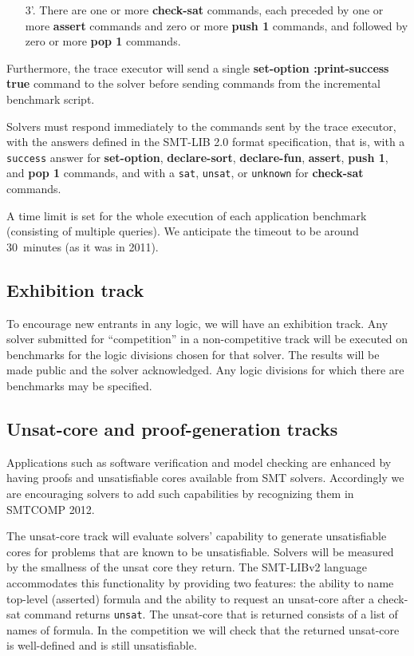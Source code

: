 \documentclass[12pt]{article}
\newcommand{\akey}[1]{\textbf{#1}}
\begin{document}
\begin{enumerate}
\item[3'.] There are one or more \akey{check-sat} commands, 
  each preceded by one or more \akey{assert} commands 
  and zero or more \akey{push 1} commands, 
  and followed by zero or more \akey{pop 1} commands.
\end{enumerate}

\noindent
Furthermore, the trace executor will send a single 
\akey{set-option :print-success true} command to the solver before 
sending commands from the incremental benchmark script.

\medskip
Solvers must respond immediately to the commands sent by the trace executor, 
with the answers defined in the SMT-LIB 2.0 format specification, that is,
with a \texttt{success} answer for 
\akey{set-option}, 
\akey{declare-sort}, 
\akey{declare-fun}, 
\akey{assert}, 
\akey{push 1}, 
and \akey{pop 1} 
commands,
and with a \texttt{sat}, \texttt{unsat}, or \texttt{unknown} 
for \akey{check-sat} commands.

A time limit is set for the whole execution of each application
benchmark (consisting of multiple queries).  We anticipate the
timeout to be around 30~minutes (as it was in 2011).

\subsection{Exhibition track}

To encourage new entrants in any logic, we will have an exhibition track.
Any solver submitted for ``competition'' in a non-competitive track will
be executed on benchmarks for the logic divisions chosen for that solver.
The results will be made public and the solver acknowledged. Any logic divisions
for which there are benchmarks may be specified.

\subsection{Unsat-core and proof-generation tracks}

Applications such as software verification and model checking are enhanced by having
proofs and unsatisfiable cores available from SMT solvers. Accordingly we are 
encouraging solvers to add such capabilities by recognizing them in SMTCOMP 2012.

The unsat-core track will evaluate solvers' capability to generate unsatisfiable cores for
problems that are known to be unsatisfiable. Solvers will be measured by the smallness of
the unsat core they return. The SMT-LIBv2 language accommodates this functionality by 
providing two features: the ability to name top-level (asserted) formula and the ability to
request an unsat-core after a check-sat command returns \texttt{unsat}. The unsat-core that
is returned consists of a list of names of formula. In the competition we will check that the
returned unsat-core is well-defined and is still unsatisfiable.
\end{document}
